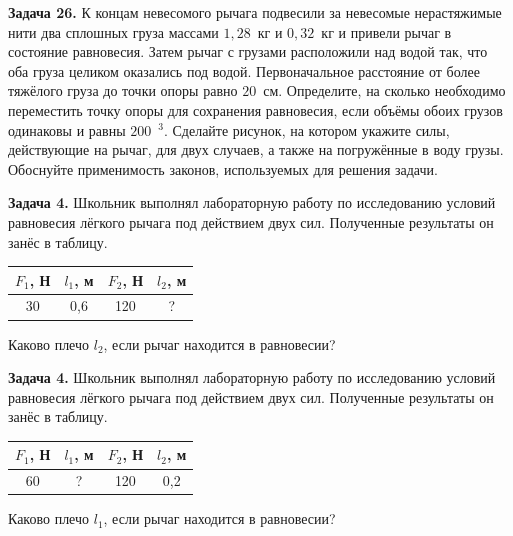 
\begin{taskbasic}[code={\label{task:statics_v06_n26}}]
\textbf{Задача 26.} К концам невесомого рычага подвесили за невесомые нерастяжимые нити два сплошных груза массами $1{,}28$~кг и $0{,}32$~кг и привели рычаг в состояние равновесия. Затем рычаг с грузами расположили над водой так, что оба груза целиком оказались под водой. Первоначальное расстояние от более тяжёлого груза до точки опоры равно $20$~см. Определите, на сколько необходимо переместить точку опоры для сохранения равновесия, если объёмы обоих грузов одинаковы и равны $200$~$^3$. Сделайте рисунок, на котором укажите силы, действующие на рычаг, для двух случаев, а также на погружённые в воду грузы. Обоснуйте применимость законов, используемых для решения задачи.

\end{taskbasic}


\begin{taskbasic}[code={\label{task:statics_v11_n04}}]
\textbf{Задача 4.} Школьник выполнял лабораторную работу по исследованию условий равновесия лёгкого рычага под действием двух сил. Полученные результаты он занёс в таблицу.

\begin{center}
\begin{tabular}{|c|c|c|c|}
\hline
$F_{1}$, Н & $l_{1}$, м & $F_{2}$, Н & $l_{2}$, м \\ \hline
30 & 0{,}6 & 120 & ? \\ \hline
\end{tabular}
\end{center}

Каково плечо $l_{2}$, если рычаг находится в равновесии?

\end{taskbasic}

\begin{taskbasic}[code={\label{task:statics_v12_n04}}]
\textbf{Задача 4.} Школьник выполнял лабораторную работу по исследованию условий равновесия лёгкого рычага под действием двух сил. Полученные результаты он занёс в таблицу.

\begin{center}
\begin{tabular}{|c|c|c|c|}
\hline
$F_{1}$, Н & $l_{1}$, м & $F_{2}$, Н & $l_{2}$, м \\ \hline
60 & ? & 120 & 0{,}2 \\ \hline
\end{tabular}
\end{center}

Каково плечо $l_{1}$, если рычаг находится в равновесии?

\end{taskbasic}

